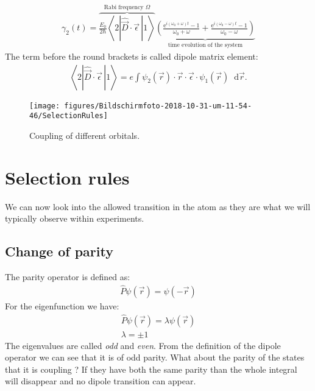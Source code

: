 \documentclass[10pt]{article}
\newcommand{\braket}[1]{\ensuremath{\left\langle#1\right\rangle}}
\newcommand*\dif{\mathop{}\!\mathrm{d}}
\newcommand{\eexp}[1]{\mathrm{e}^{#1}}
\begin{document}
\begin{align}
\gamma_2(t) = \overbrace{\frac{E_0}{2\hbar} \braket{2|\hat{\vec{D}}\cdot \vec{\epsilon}\,|1}}^{\text{Rabi frequency }\Omega} \underbrace{\left(\frac{\eexp{i(\omega_0 + \omega)t}-1}{\omega_0 + \omega} + \frac{\eexp{i(\omega_0 - \omega)t}-1}{\omega_0 - \omega}\right)}_{\text{time evolution of the system}}
\end{align}
%
The term before the round brackets is called dipole matrix element:
%
\begin{align}\label{Eq:DipOp}
\braket{2|\hat{\vec{D}}\cdot \vec{\epsilon}\,|1} =e \int \psi_2\left(\vec{r}\right) \cdot \vec{r} \cdot \vec{\epsilon} \cdot \psi_1\left(\vec{r}\right) \dif \vec{r}.
\end{align}
\begin{figure}[h!]
\begin{center}
\texttt{[image: figures/Bildschirmfoto-2018-10-31-um-11-54-46/SelectionRules]}
\caption{{Coupling of different orbitals.
{\label{708926}}%
}}
\end{center}
\end{figure}

\section{Selection rules}
We can now look into the allowed transition in the atom as they are what we will typically observe within experiments.

\subsection{Change of parity}
The parity operator is defined as:
\begin{align}
\hat{P}\psi(\vec{r}) = \psi(-\vec{r})
\end{align}
For the eigenfunction we have:
\begin{align}
\hat{P} \psi(\vec{r}) = \lambda \psi(\vec{r})\\
\lambda = \pm 1
\end{align}
The eigenvalues are called \textit{odd} and \textit{even}. From the definition of the dipole operator we can see that it is of odd parity. What about the parity of the states that it is coupling ? If they have both the same parity than the whole integral will disappear and no dipole transition can appear. 
\end{document}
